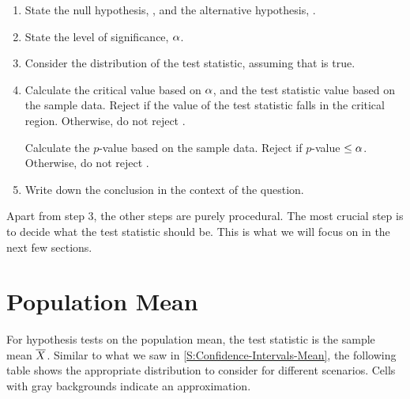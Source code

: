 \begin{recipe}
    \phantom{.}
    \begin{enumerate}
        \item State the null hypothesis, \nullhyp, and the alternative hypothesis, \althyp.
        \item State the level of significance, $\alpha$.
        \item Consider the distribution of the test statistic, assuming that \nullhyp{} is true.
        \item {} Calculate the critical value based on $\alpha$, and the test statistic value based on the sample data. Reject \nullhyp{} if the value of the test statistic falls in the critical region. Otherwise, do not reject \nullhyp.

         Calculate the $p$-value based on the sample data. Reject \nullhyp{} if $p$-value $\leq \alpha$. Otherwise, do not reject \nullhyp.
        \item Write down the conclusion in the context of the question.
    \end{enumerate}
\end{recipe}

Apart from step 3, the other steps are purely procedural. The most crucial step is to decide what the test statistic should be. This is what we will focus on in the next few sections.

\section{Population Mean}

For hypothesis tests on the population mean, the test statistic is the sample mean $\overline{X}$. Similar to what we saw in \SS\ref{S:Confidence-Intervals-Mean}, the following table shows the appropriate distribution to consider for different scenarios. Cells with gray backgrounds indicate an approximation.

